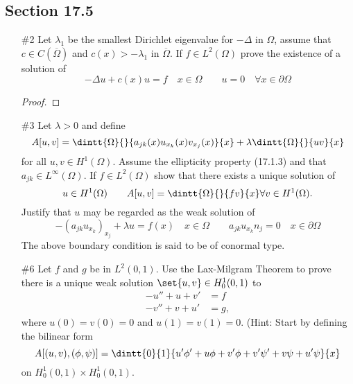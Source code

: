 \documentclass[11pt, oneside]{article}
\begin{document}
\subsection*{Section 17.5}
\begin{enumerate}
  \item[\#2]
    Let $\lambda_1$ be the smallest Dirichlet eigenvalue for $-\Delta$ in
    $\Omega$, assume that $c \in C(\overline{\Omega})$ and $c(x) > -\lambda_1$
    in $\overline{\Omega}$.
    If $f \in L^2(\Omega)$ prove the existence of a solution of
    \[
      -\Delta u + c(x) u = f \quad x \in \Omega \qquad u = 0 \quad \forall x \in \partial \Omega
    \]  

    \begin{proof}
      
    \end{proof}

  \item[\#3]
    Let $\lambda > 0$ and define
    \[
      A[u, v] = \dintt{\Omega}{}{a_{jk}(x)u_{x_k}(x) v_{x_j}(x)}{x} + \lambda \dintt{\Omega}{}{uv}{x}
    \]
    for all $u, v \in H^1(\Omega)$.
    Assume the ellipticity property (17.1.3) and that $a_{jk} \in L^{\infty}(\Omega)$.
    If $f \in L^2(\Omega)$ show that there exists a unique solution of
    \[
      u \in H^1(\Omega) \qquad A[u, v] = \dintt{\Omega}{}{fv}{x} \forall v \in H^1(\Omega).
    \]
    Justify that $u$ may be regarded as the weak solution of
    \[
      -(a_{jk}u_{x_k})_{x_j} + \lambda u = f(x) \quad x \in \Omega \qquad a_{jk}u_{x_k}n_j = 0 \quad x \in \partial \Omega
    \]
    The above boundary condition is said to be of conormal type.

  \item[\#6]
    Let $f$ and $g$ be in $L^2(0, 1)$.
    Use the Lax-Milgram Theorem to prove there is a unique weak solution
    $\set{u, v} \in H^1_0(0, 1)$ to
    \begin{align*}
      -u'' + u + v' &= f \\
      -v'' + v + u' &= g,
    \end{align*}
    where $u(0) = v(0) = 0$ and $u(1) = v(1) = 0$.
    (Hint: Start by defining the bilinear form
    \[
      A[(u, v), (\phi, \psi)] = \dintt{0}{1}{u'\phi' + u\phi + v'\phi + v'\psi' + v\psi + u'\psi}{x}
    \]
    on $H^1_0(0, 1) \times H^1_0(0, 1)$.

\end{enumerate}
\end{document}
